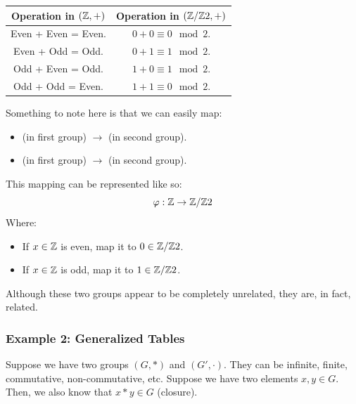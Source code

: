 \documentclass[letterpaper]{article}
\begin{document}
\begin{center}
    \begin{tabular}{c|c}
        Operation in $(\mathbb{Z}, +)$ & Operation in $(\mathbb{Z} / \mathbb{Z} 2, +)$ \\ 
        \hline 
        Even + Even = Even. & $0 + 0 \equiv 0 \mod{2}$. \\ 
        Even + Odd = Odd. & $0 + 1 \equiv 1 \mod{2}$. \\ 
        Odd + Even = Odd. & $1 + 0 \equiv 1 \mod{2}$. \\ 
        Odd + Odd = Even. & $1 + 1 \equiv 0 \mod{2}$.
    \end{tabular}
\end{center}

Something to note here is that we can easily map:
\begin{itemize}
    \item {} (in first group) $\to$  (in second group).
    \item {} (in first group) $\to$  (in second group).
\end{itemize}
This mapping can be represented like so: 
\[\varphi: \mathbb{Z} \to \mathbb{Z} / \mathbb{Z} 2\]
Where: 
\begin{itemize}
    \item If $x \in \mathbb{Z}$ is even, map it to $0 \in \mathbb{Z} / \mathbb{Z} 2$. 
    \item If $x \in \mathbb{Z}$ is odd, map it to $1 \in \mathbb{Z} / \mathbb{Z} 2$. 
\end{itemize}
Although these two groups appear to be completely unrelated, they are, in fact, related. 

\subsubsection{Example 2: Generalized Tables}
Suppose we have two groups $(G, *)$ and $(G', \cdot)$. They can be infinite, finite, commutative, non-commutative, etc. Suppose we have two elements $x, y \in G$. Then, we also know that $x * y \in G$ (closure). 

\bigskip 
\end{document}
